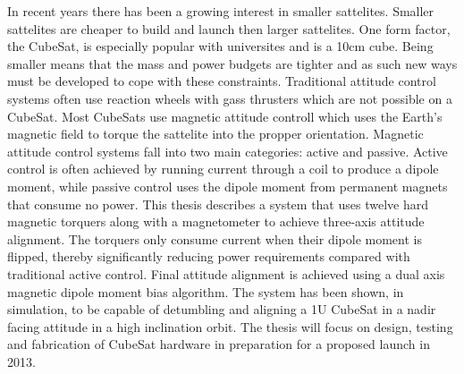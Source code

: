 In recent years there has been a growing interest in smaller sattelites. Smaller sattelites are cheaper to build and launch then larger sattelites. One form factor, the CubeSat, is especially popular with universites and is a 10cm cube. Being smaller means that the mass and power budgets are tighter and as such new ways must be developed to cope with these constraints. Traditional attitude control systems often use reaction wheels with gass thrusters which are not possible on a CubeSat. Most CubeSats use magnetic attitude controll which uses the Earth's magnetic field to torque the sattelite into the propper orientation. Magnetic attitude control systems fall into two main categories: active and passive. Active control is often achieved by running current through a coil to produce a dipole moment, while passive control uses the dipole moment from permanent magnets that consume no power. This thesis describes a system that uses twelve hard magnetic torquers along with a magnetometer to achieve three-axis attitude alignment. The torquers only consume current when their dipole moment is flipped, thereby significantly reducing power requirements compared with traditional active control.  Final attitude alignment is achieved using a dual axis magnetic dipole moment bias algorithm. The system has been shown, in simulation, to be capable of detumbling and aligning a 1U CubeSat in a nadir facing attitude in a high inclination orbit. The thesis will focus on design, testing and fabrication of CubeSat hardware in preparation for a proposed launch in 2013.

